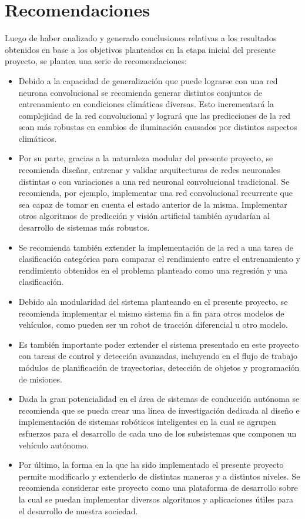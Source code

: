 \section{Recomendaciones}

Luego de haber analizado y generado conclusiones relativas a los resultados obtenidos en base a los objetivos planteados en 
la etapa inicial del presente proyecto, se plantea una serie de recomendaciones:

\begin{itemize}
    \item Debido a la capacidad de generalización que puede lograrse con una red neurona convolucional se recomienda 
    generar distintos conjuntos de entrenamiento en condiciones climáticas diversas. Esto incrementará la complejidad 
    de la red convolucional y logrará que las predicciones de la red sean más robustas en cambios de iluminación 
    causados por distintos aspectos climáticos.
    \item Por su parte, gracias a la naturaleza modular del presente proyecto, se recomienda diseñar, entrenar y 
    validar arquitecturas de redes neuronales distintas o con variaciones a una red neuronal convolucional 
    tradicional. Se recomienda, por ejemplo, implementar una red convolucional recurrente que sea capaz de tomar 
    en cuenta el estado anterior de la misma. Implementar otros algoritmos de predicción y visión artificial también 
    ayudarían al desarrollo de sistemas más robustos.
    \item Se recomienda también extender la implementación de la red a una tarea de clasificación categórica para 
    comparar el rendimiento entre el entrenamiento y rendimiento obtenidos en el problema planteado como una regresión 
    y una clasificación.
    \item Debido ala modularidad del sistema planteando en el presente proyecto, se recomienda implementar el mismo 
    sistema fin a fin para otros modelos de vehículos, como pueden ser un robot de tracción diferencial u otro modelo.
    \item Es también importante poder extender el sistema presentado en este proyecto con tareas de control y detección 
    avanzadas, incluyendo en el flujo de trabajo módulos de planificación de trayectorias, detección de objetos y 
    programación de misiones.
    \item Dada la gran potencialidad en el área de sistemas de conducción autónoma se recomienda que se pueda crear 
    una línea de investigación dedicada al diseño e implementación de sistemas robóticos inteligentes en la cual 
    se agrupen esfuerzos para el desarrollo de cada uno de los subsistemas que componen un vehículo autónomo. 
    \item Por último, la forma en la que ha sido implementado el presente proyecto permite modificarlo y extenderlo 
    de distintas maneras y a distintos niveles. Se recomienda considerar este proyecto como una plataforma de 
    desarrollo sobre la cual se puedan implementar diversos algoritmos y aplicaciones útiles para el desarrollo de 
    nuestra sociedad.

\end{itemize}